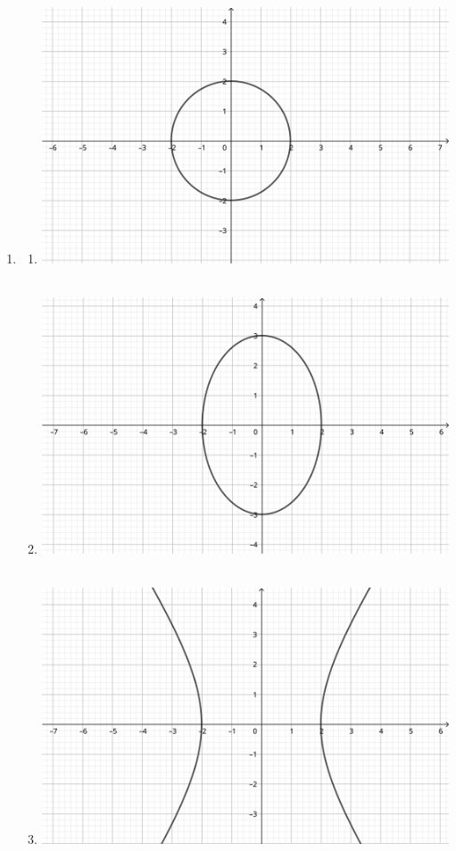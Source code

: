 \documentclass[../practica_02.tex]{subfiles}
\begin{document}
    \begin{enumerate}
        \item
            \begin{enumerate}
                \item \includegraphics[scale=0.8]{ej05/resources/1a.png} $ $
                \item \includegraphics[scale=0.8]{ej05/resources/1b.png} $ $
                \item \includegraphics[scale=0.8]{ej05/resources/1c.png} $ $

\end{enumerate}
\end{enumerate}
\end{document}
